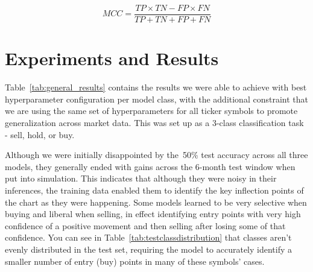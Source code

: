 \documentclass[10pt,twocolumn,letterpaper]{article}
\begin{document}
\begin{equation} \label{eq:mcc}
    MCC = \frac{TP \times TN - FP \times FN}{TP + TN + FP + FN}
\end{equation}


\section{Experiments and Results}

Table~\ref{tab:general_results} contains the results we were able to achieve with best hyperparameter configuration per model class, with the additional constraint that we are using the same set of hyperparameters for all ticker symbols to promote generalization across market data. This was set up as a 3-class classification task - sell, hold, or buy.

\begin{table}
\begin{center}
\end{center}
\caption{Data splits and time frames.}
\label{tab:general_results}
\end{table}

Although we were initially disappointed by the~50\% test accuracy across all three models, they generally ended with gains across the 6-month test window when put into simulation. This indicates that although they were noisy in their inferences, the training data enabled them to identify the key inflection points of the chart as they were happening. Some models learned to be very selective when buying and liberal when selling, in effect identifying entry points with very high confidence of a positive movement and then selling after losing some of that confidence. You can see in Table~\ref{tab:testclassdistribution} that classes aren't evenly distributed in the test set, requiring the model to accurately identify a smaller number of entry (buy) points in many of these symbols' cases.
\end{document}
